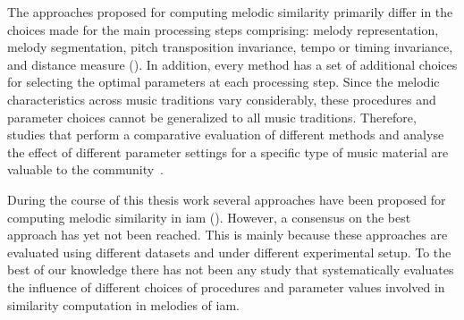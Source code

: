 The approaches proposed for computing melodic similarity primarily differ in the choices made for the main processing steps comprising: melody representation, melody segmentation, pitch transposition invariance, tempo or timing invariance, and distance measure (). In addition, every method has a set of additional choices for selecting the optimal parameters at each processing step. Since the melodic characteristics across music traditions vary considerably, these procedures and parameter choices cannot be generalized to all music traditions. Therefore, studies that perform a comparative evaluation of different methods and analyse the effect of different parameter settings for a specific type of music material are valuable to the community~\citep{RBDannenberg2007QBH,Rao2014,XavierSerra2011}.

During the course of this thesis work several approaches have been proposed for computing melodic similarity in \gls{iam} (). However, a consensus on the best approach has yet not been reached. This is mainly because these approaches are evaluated using different datasets and under different experimental setup. To the best of our knowledge there has not been any study that systematically evaluates the influence of different choices of procedures and parameter values involved in similarity computation in melodies of \gls{iam}.





